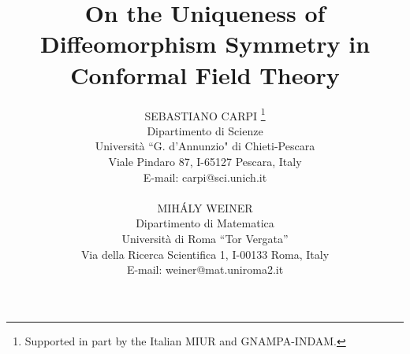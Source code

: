 \documentclass[12pt]{article}
\begin{document}
\def\RR{{\mathbb R}}
\def\CC{{\mathbb C}}
\def\NN{{\mathbb N}}
\def\ZZ{{\mathbb Z}}
\def\s1{{S^1}}
\def\diff{{{\rm Diff}^+(S^1)}}
\def\vect{{{\rm Vect}(S^1)}}
\def\sl2{{{\rm SL}(2,\RR)}}
\def\psl2{{{\rm PSL}(2,\RR)}}
\def\mob{\text {M\"{o}b}}
\def\u1{{{\rm U}(1)}}
\def\su2{{{\rm SU}(2)}}
\def\suN{{{\rm SU}(N)}}
\def\so3{{{\rm SO}(3)}}
\def\gk {{G_k}}
\def\Dl{{\mathcal D}(L_0)}
\newcommand{\fin}{{\mathcal D}\!_{f\!in}}
\def\A{{\mathcal A}}
\def\B{{\mathcal B}}
\def\C{{\mathcal C}}
\def\D{{\mathcal D}}
\def\F{{\mathcal F}}
\def\H{{\mathcal H}}
\def\I{{\mathcal I}}
\def\K{{\mathcal K}}
\def\k{{\rm K}}
\def\M{{\mathcal M}}
\def\N{{\mathcal N}}
\def\O{{\mathcal O}}
\def\P{{\mathcal P}}
\def\R{{\mathcal R}}
\def\S{{\mathcal S}}
\def\T{{\mathcal T}}
\def\U{{\mathcal U}}
\def\V{{\mathcal V}}
\def\W{{\mathcal W}}
\def\G{{\bf G}}

\newtheorem{theorem}{Theorem}[section]
\newtheorem{definition}[theorem]{Definition}
\newtheorem{corollary}[theorem]{Corollary}
\newtheorem{proposition}[theorem]{Proposition}
\newtheorem{lemma}[theorem]{Lemma}
\newtheorem{remark}[theorem]{Remark}
\title{{\huge {\bf On the Uniqueness of Diffeomorphism Symmetry 
in Conformal Field Theory}}}

\author{SEBASTIANO CARPI 
\footnote{Supported in part by the Italian MIUR and GNAMPA-INDAM.} 
\\ Dipartimento di Scienze 
\\ Universit\`a ``G. d'Annunzio" di Chieti-Pescara 
\\ Viale Pindaro 87, I-65127 Pescara, Italy
\\ E-mail: carpi@sci.unich.it 
\\ {} \\ MIH\'ALY WEINER 
\\ Dipartimento di Matematica 
\\ Universit\`a di Roma ``Tor Vergata'' 
\\ Via della Ricerca Scientifica 1, I-00133 Roma, Italy
\\ E-mail: weiner@mat.uniroma2.it}
\date{} 

\maketitle 
\renewcommand{\sectionmark}[1]{} 
\end{document}

